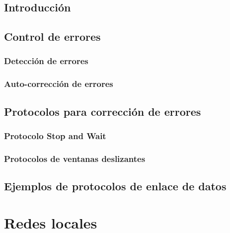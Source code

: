 \documentclass[
]{book}
\begin{document}
\hypertarget{introducciuxf3n-1}{%
\section{Introducción}\label{introducciuxf3n-1}}

\hypertarget{control-de-errores}{%
\section{Control de errores}\label{control-de-errores}}

\hypertarget{detecciuxf3n-de-errores}{%
\subsection{Detección de errores}\label{detecciuxf3n-de-errores}}

\hypertarget{auto-correcciuxf3n-de-errores}{%
\subsection{Auto-corrección de errores}\label{auto-correcciuxf3n-de-errores}}

\hypertarget{protocolos-para-correcciuxf3n-de-errores}{%
\section{Protocolos para corrección de errores}\label{protocolos-para-correcciuxf3n-de-errores}}

\hypertarget{protocolo-stop-and-wait}{%
\subsection{Protocolo Stop and Wait}\label{protocolo-stop-and-wait}}

\hypertarget{protocolos-de-ventanas-deslizantes}{%
\subsection{Protocolos de ventanas deslizantes}\label{protocolos-de-ventanas-deslizantes}}

\hypertarget{ejemplos-de-protocolos-de-enlace-de-datos}{%
\section{Ejemplos de protocolos de enlace de datos}\label{ejemplos-de-protocolos-de-enlace-de-datos}}

\hypertarget{redes-locales}{%
\chapter{Redes locales}\label{redes-locales}}
\end{document}
